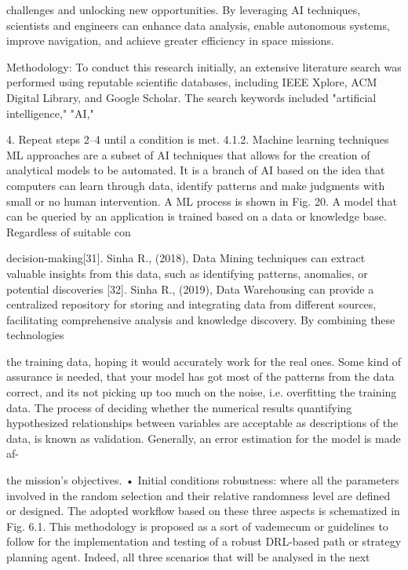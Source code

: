 \documentclass[a4paper,12pt]{article}
\begin{document}
challenges and unlocking new opportunities. By 
leveraging AI techniques, scientists and engineers 
can enhance data analysis, enable autonomous 
systems, improve navigation, and achieve greater 
efficiency in space missions. 
 
Methodology: 
To conduct this research initially, an extensive 
literature search was performed using reputable 
scientific databases, including IEEE Xplore, ACM 
Digital Library, and Google Scholar. The search 
keywords included "artificial intelligence," "AI,"

4. Repeat steps 2–4 until a condition is met. 
4.1.2. Machine learning techniques 
ML approaches are a subset of AI techniques that allows for the 
creation of analytical models to be automated. It is a branch of AI based 
on the idea that computers can learn through data, identify patterns and 
make judgments with small or no human intervention. A ML process is 
shown in Fig. 20. A model that can be queried by an application is 
trained based on a data or knowledge base. Regardless of suitable con­

decision-making[31]. Sinha R., (2018), Data Mining techniques can extract valuable insights from this data, such as identifying patterns, 
anomalies, or potential discoveries [32]. Sinha R., (2019), Data Warehousing can provide a centralized repository for storing and 
integrating data from different sources, facilitating comprehensive analysis and knowledge discovery. By combining these technologies

the training data, hoping it would accurately work for the real ones.
Some kind of assurance is needed, that your model has got most of
the patterns from the data correct, and its not picking up too much
on the noise, i.e. overﬁtting the training data. The process of deciding
whether the numerical results quantifying hypothesized relationships
between variables are acceptable as descriptions of the data, is known
as validation. Generally, an error estimation for the model is made af-

the mission’s objectives.
• Initial conditions robustness: where all the parameters involved in
the random selection and their relative randomness level are defined or
designed.
The adopted workflow based on these three aspects is schematized in Fig. 6.1.
This methodology is proposed as a sort of vademecum or guidelines to follow
for the implementation and testing of a robust DRL-based path or strategy
planning agent. Indeed, all three scenarios that will be analysed in the next
\end{document}
